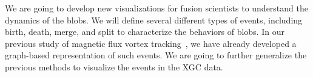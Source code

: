 We are going to develop new visualizations for fusion scientists to understand the dynamics of the blobs.  We will define several different types of events, including birth, death, merge, and split to characterize the behaviors of blobs.  In our previous study of magnetic flux vortex tracking~\cite{GuoPPKG16, GuoPG17, PhillipsGPKG16, PhillipsPKG15}, we have already developed a graph-based representation of such events.  We are going to further generalize the previous methods to visualize the events in the XGC data.  

% 


% 

